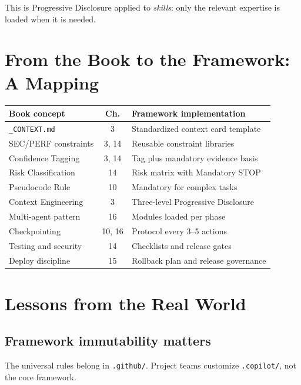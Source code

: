 This is Progressive Disclosure applied to \emph{skills}: only the relevant expertise is loaded when it is needed.

\section{From the Book to the Framework: A Mapping}

\begin{center}
\begin{small}
\begin{tabularx}{\textwidth}{l c X}
\toprule
\textbf{Book concept} & \textbf{Ch.} & \textbf{Framework implementation} \\
\midrule
\texttt{\_CONTEXT.md} & 3 & Standardized context card template \\
SEC/PERF constraints & 3, 14 & Reusable constraint libraries \\
Confidence Tagging & 3, 14 & Tag plus mandatory evidence basis \\
Risk Classification & 14 & Risk matrix with Mandatory STOP \\
Pseudocode Rule & 10 & Mandatory for complex tasks \\
Context Engineering & 3 & Three-level Progressive Disclosure \\
Multi-agent pattern & 16 & Modules loaded per phase \\
Checkpointing & 10, 16 & Protocol every 3--5 actions \\
Testing and security & 14 & Checklists and release gates \\
Deploy discipline & 15 & Rollback plan and release governance \\
\bottomrule
\end{tabularx}
\end{small}
\end{center}

\section{Lessons from the Real World}

\subsection{Framework immutability matters}
The universal rules belong in \texttt{.github/}. Project teams customize \texttt{.copilot/}, not the core framework.

